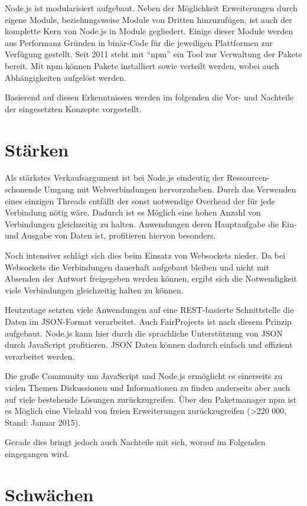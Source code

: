 Node.js ist modularisiert aufgebaut. Neben der Möglichkeit Erweiterungen
durch eigene Module, beziehungsweise Module von Dritten hinzuzufügen,
ist auch der komplette Kern von Node.js in Module gegliedert. Einige
dieser Module werden aus Performanz Gründen in binär-Code für die
jeweiligen Plattformen zur Verfügung gestellt. Seit 2011 steht mit
``npm'' ein Tool zur Verwaltung der Pakete bereit. Mit npm können Pakete
installiert sowie verteilt werden, wobei auch Abhängigkeiten aufgelöst
werden.

Basierend auf diesen Erkenntnissen werden im folgenden die Vor- und
Nachteile der eingesetzten Konzepte vorgestellt.

\section{Stärken}\label{stuxe4rken}

Als stärkstes Verkaufsargument ist bei Node.js eindeutig der
Ressourcen-schonende Umgang mit Webverbindungen hervorzuheben. Durch das
Verwenden eines einzigen Threads entfällt der sonst notwendige Overhead
der für jede Verbindung nötig wäre. Dadurch ist es Möglich eine hohen
Anzahl von Verbindungen gleichzeitig zu halten. Anwendungen deren
Hauptaufgabe die Ein- und Ausgabe von Daten ist, profitieren hiervon
besonders.

Noch intensiver schlägt sich dies beim Einsatz von Websockets nieder. Da
bei Websockets die Verbindungen dauerhaft aufgebaut bleiben und nicht
mit Absenden der Antwort freigegeben werden können, ergibt sich die
Notwendigkeit viele Verbindungen gleichzeitig halten zu können.

Heutzutage setzten viele Anwendungen auf eine REST-basierte
Schnittstelle die Daten im JSON-Format verarbeitet. Auch FairProjects
ist nach diesem Prinzip aufgebaut. Node.js kann hier durch die
sprachliche Unterstützung von JSON durch JavaScript profitieren. JSON
Daten können dadurch einfach und effizient verarbeitet werden.

Die große Community um JavaScript und Node.js ermöglicht es einerseits
zu vielen Themen Diskussionen und Informationen zu finden anderseits
aber auch auf viele bestehende Lösungen zurückzugreifen. Über den
Paketmanager npm ist es Möglich eine Vielzahl von freien Erweiterungen
zurückzugreifen (\textgreater{}220 000, Stand: Januar 2015).

Gerade dies bringt jedoch auch Nachteile mit sich, worauf im Folgenden
eingegangen wird.

\section{Schwächen}\label{schwuxe4chen}

